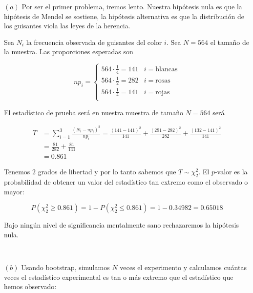 \documentclass[a4paper, 12pt]{article}
\begin{document}
$(a)$ Por ser el primer problema, iremos lento. Nuestra hipótesis nula es que la
hipótesis de Mendel se sostiene, la hipótesis alternativa es que la distribución
de los guisantes viola las leyes de la herencia.


Sea $N_i$ la frecuencia observada de guisantes del color $i$. Sea $N = 564$ el
tamaño de la muestra. Las proporciones esperadas son

\begin{equation*}
    np_i = \begin{cases}
        564 \cdot \frac{1}{4} = 141 & i = \text{blancas}\\
        564 \cdot \frac{1}{2} = 282 & i = \text{rosas}\\
        564 \cdot \frac{1}{4} = 141 & i = \text{rojas}\\
    \end{cases}
\end{equation*}

El estadístico de prueba será en nuestra muestra de
tamaño $N = 564$ será 

\begin{align*}
    T 
    &= \sum_{i=1}^3 \frac{(N_i - np_i)^2}{np_i} = \frac{(141 -141 )^2}{141} +
    \frac{(291-282)^2}{282} + \frac{(132-141)^2}{141} \\ 
    &=\frac{81}{282} + \frac{81}{141} \\ 
    &=0.861
\end{align*}

Tenemos $2$ grados de libertad y por lo tanto sabemos que $T \sim \chi^2_2$. El
$p$-valor es la probabilidad de obtener un valor del estadístico tan extremo
como el observado o mayor:

\begin{equation*}
    P(\chi_2^2 \geq 0.861) = 1 - P(\chi_2^2 \leq 0.861) = 1 - 0.34982 = 0.65018
\end{equation*}

Bajo ningún nivel de significancia mentalmente sano rechazaremos la hipótesis
nula.

~

$(b)$  Usando bootstrap, simulamos $N$ veces el experimento y calculamos cuántas
veces el estadístico experimental es tan o más extremo que el estadístico que
hemos observado:
\end{document}
